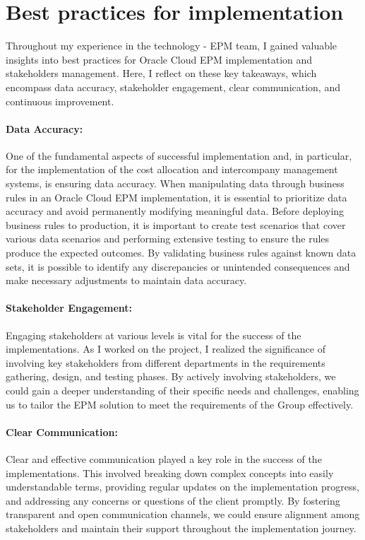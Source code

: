 \documentclass[12pt,a4paper,openright,twoside]{book}
\begin{document}
\section{Best practices for implementation}

Throughout my experience in the technology - EPM team, I gained valuable insights into best practices for Oracle Cloud EPM implementation and stakeholders management.
%
Here, I reflect on these key takeaways, which encompass data accuracy, stakeholder engagement, clear communication, and continuous improvement.

\paragraph{Data Accuracy:}
One of the fundamental aspects of successful implementation and, in particular, for the implementation of the cost allocation and intercompany management systems, is ensuring data accuracy. 
%
When manipulating data through business rules in an Oracle Cloud EPM implementation, it is essential to prioritize data accuracy and avoid permanently modifying meaningful data. 
%
Before deploying business rules to production, it is important to create test scenarios that cover various data scenarios and performing extensive testing to ensure the rules produce the expected outcomes. 
%
By validating business rules against known data sets, it is possible to identify any discrepancies or unintended consequences and make necessary adjustments to maintain data accuracy.

\paragraph{Stakeholder Engagement:}
Engaging stakeholders at various levels is vital for the success of the implementations. 
%
As I worked on the project, I realized the significance of involving key stakeholders from different departments in the requirements gathering, design, and testing phases. 
%
By actively involving stakeholders, we could gain a deeper understanding of their specific needs and challenges, enabling us to tailor the EPM solution to meet the requirements of the Group effectively.

\paragraph{Clear Communication:}
Clear and effective communication played a key role in the success of the implementations. 
%
This involved breaking down complex concepts into easily understandable terms, providing regular updates on the implementation progress, and addressing any concerns or questions of the client promptly. 
%
By fostering transparent and open communication channels, we could ensure alignment among stakeholders and maintain their support throughout the implementation journey.
\end{document}
